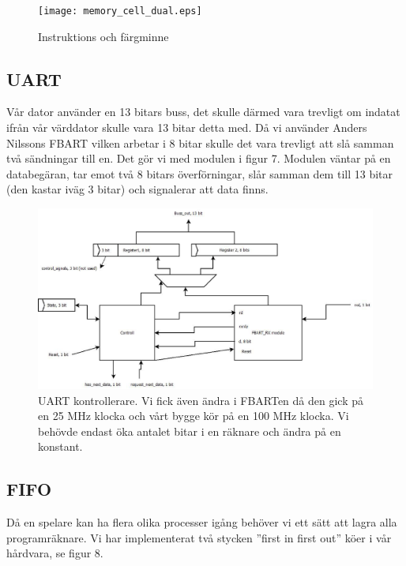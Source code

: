 \documentclass[11pt]{article}
\begin{document}
\begin{figure}[h]
    \begin{center}
        \texttt{[image: memory\_cell\_dual.eps]}
        \caption{Instruktions och färgminne}
        \label{fig:memory_cell_dual}
    \end{center}
\end{figure}

\subsection{UART}

Vår dator använder en 13 bitars buss, det skulle därmed vara trevligt om indatat ifrån vår värddator skulle vara 13 bitar detta med. Då vi använder Anders Nilssons FBART vilken arbetar i 8 bitar skulle det vara trevligt att slå samman två sändningar till en. Det gör vi med modulen i figur 7. Modulen väntar på en databegäran, tar emot två 8 bitars överförningar, slår samman dem till 13 bitar (den kastar iväg 3 bitar) och signalerar att data finns.

\begin{figure}[h]
    \begin{center}
        \includegraphics[width=13cm]{uart.eps}
        \caption{UART kontrollerare. Vi fick även ändra i FBARTen då den gick på en 25 MHz klocka och vårt bygge kör på en 100 MHz klocka. Vi behövde endast öka antalet bitar i en räknare och ändra på en konstant.}
        \label{fig:uart}
    \end{center}
\end{figure}

\subsection{FIFO}

Då en spelare kan ha flera olika processer igång behöver vi ett sätt att lagra alla programräknare. Vi har implementerat två stycken ”first in first out” köer i vår hårdvara, se figur 8.
\end{document}
